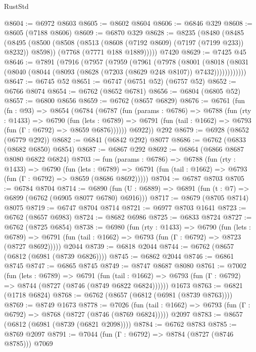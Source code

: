 \begin{lexlean}{RustStd}
\begin{coremodule}
@8604 := @6972 @8603
@8605 := @8602 @8604
@8606 := @6846 @329
@8608 := @8605 (@7188 @8606)
@8609 := @6870 @329
@8628 := @8235
    (@8480
      (@8485
        (@8495
          (@8500 (@8508 (@8513 (@8608 (@7192 @8609) (@7197 (@7199 @233)) @8232)) @8598))
          (@7768 (@7771 @188 @1889)))))
    @7420
@8629 := @7425 @45
@8646 := @7891
    (@7916
      (@7957
        (@7959
          (@7961
            (@7978
              (@8001
                (@8018
                  (@8031 (@8040 (@8044 (@8093 (@8628 (@7203 (@8629 @248 @8107)) @7432))))))))))))
@8647 := @6745 @52
@8651 := @6747 (@6751 @52) (@6757 @52)
@8652 := @6766 @8074
@8654 := @6762 (@8652 @6781)
@8656 := @6804 (@6805 @52)
@8657 := @6800 @8656
@8659 := @6762 (@8657 @6829)
@8676 := @6761
    (fun (fn : @93) =>
    @8654
      (@6784
        (@6787
          (fun (params : @6786) =>
          @6788
            (fun (rty : @1433) =>
            @6790
              (fun (lets : @6789) =>
              @6791 (fun (tail : @1662) => @6793 (fun (Γ : @6792) => @8659 @6876))))))
        @6922))
    @292
@8679 := @6928 (@8652 (@6779 @292))
@8682 := @6841 (@6842 @292) @8077
@8686 := @6762 (@6833 (@8682 @6850) @6854)
@8687 := @6867 @292
@8692 := @6864 (@6866 @8687 @8080 @6822 @6824)
@8703 := fun (params : @6786) =>
  @6788
    (fun (rty : @1433) =>
    @6790
      (fun (lets : @6789) =>
      @6791 (fun (tail : @1662) => @6793 (fun (Γ : @6792) => @8659 (@8686 @8692)))))
@8704 := @6787 @8703
@8705 := @6784 @8704
@8714 := @6890 (fun (U : @6889) => @6891 (fun (t : @7) => @6899 (@6762 (@6905 @8077 @6780) @6916)))
@8717 := @8679 (@8705 @8714) @8075
@8719 := @6747 @8704 @8714
@8721 := @6977 @8703 @1641
@8723 := @6762 (@8657 @6983)
@8724 := @8682 @6986
@8725 := @6833 @8724
@8727 := @6762 (@8725 @6854)
@8738 := @6980
    (fun (rty : @1433) =>
    @6790
      (fun (lets : @6789) =>
      @6791 (fun (tail : @1662) => @6793 (fun (Γ : @6792) => @8723 (@8727 @8692)))))
    @2044
@8739 := @6818 @2044
@8744 := @6762 (@8657 (@6812 (@6981 (@8739 @6826))))
@8745 := @6862 @2044
@8746 := @6861 @8745
@8747 := @6865 @8745
@8749 := @8747 @8687 @8080
@8761 := @7002
    (fun (lets : @6789) =>
    @6791
      (fun (tail : @1662) => @6793 (fun (Γ : @6792) => @8744 (@8727 (@8746 (@8749 @6822 @6824))))))
    @1673
@8763 := @6821 (@1718 @6824)
@8768 := @6762 (@8657 (@6812 (@6981 (@8739 @8763))))
@8769 := @8749 @1673
@8778 := @7026
    (fun (tail : @1662) => @6793 (fun (Γ : @6792) => @8768 (@8727 (@8746 (@8769 @6824)))))
    @2097
@8783 := @8657 (@6812 (@6981 (@8739 (@6821 @2098))))
@8784 := @6762 @8783
@8785 := @8769 @2097
@8791 := @7044 (fun (Γ : @6792) => @8784 (@8727 (@8746 @8785))) @7069

\end{coremodule}
\end{lexlean}
